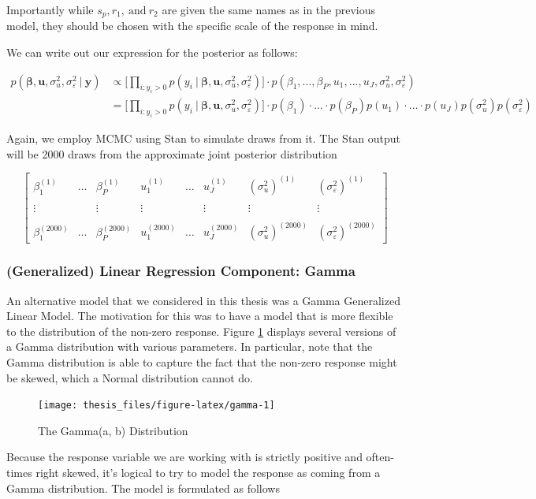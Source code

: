 \documentclass[12pt,twoside]{reedthesis}
\begin{document}
Importantly while \(s_p, r_1, \ \text{and} \ r_2\) are given the same names as in the previous model, they should be chosen with the specific scale of the response in mind.

We can write out our expression for the posterior as follows:

\[
\begin{aligned}
p(\boldsymbol{\beta}, \boldsymbol{u}, \sigma_{u}^2, \sigma_{\varepsilon}^2 \ | \ \mathbf{y}) &\propto \bigg[\prod_{i:y_{i} > 0}p(y_{i} \ | \ \boldsymbol{\beta}, \mathbf{u}, \sigma_{u}^2, \sigma_{\varepsilon}^2)\bigg]\cdot p(\beta_1, ..., \beta_P, u_1, ..., u_J, \sigma_{u}^2, \sigma_{\varepsilon}^2) \\
 &=\bigg[\prod_{i:y_{i} > 0}p(y_{i} \ | \ \boldsymbol{\beta}, \mathbf{u},\sigma_{u}^2, \sigma_{\varepsilon}^2)\bigg]\cdot p(\beta_1)\cdot...\cdot p(\beta_P)p(u_1)\cdot ... \cdot p(u_J)p(\sigma_{u}^2)p( \sigma_{\varepsilon}^2) 
\end{aligned}
\]

Again, we employ MCMC using Stan to simulate draws from it. The Stan output will be 2000 draws from the approximate joint posterior distribution

\[
\begin{bmatrix}
  \beta_1^{(1)} & \dots & \beta_P^{(1)} & u_1^{(1)} & \dots & u_J^{(1)} & (\sigma_{u}^2)^{(1)} & (\sigma_{\varepsilon}^2)^{(1)} \\
  \\ \vdots &  & \vdots & \vdots & & \vdots & \vdots & \vdots \\ \\
  \beta_1^{(2000)} & \dots & \beta_P^{(2000)} & u_1^{(2000)} & \dots & u_J^{(2000)} & (\sigma_{u}^2)^{(2000)} & (\sigma_{\varepsilon}^2)^{(2000)}
\end{bmatrix}
\]

\hypertarget{generalized-linear-regression-component-gamma}{%
\subsubsection{(Generalized) Linear Regression Component: Gamma}\label{generalized-linear-regression-component-gamma}}

An alternative model that we considered in this thesis was a Gamma Generalized Linear Model. The motivation for this was to have a model that is more flexible to the distribution of the non-zero response. Figure \ref{fig:gamma} displays several versions of a Gamma distribution with various parameters. In particular, note that the Gamma distribution is able to capture the fact that the non-zero response might be skewed, which a Normal distribution cannot do.
\begin{figure}

{\centering \texttt{[image: thesis\_files/figure-latex/gamma-1]} 

}

\caption{The Gamma(a, b) Distribution}\label{fig:gamma}
\end{figure}
Because the response variable we are working with is strictly positive and often-times right skewed, it's logical to try to model the response as coming from a Gamma distribution. The model is formulated as follows
\end{document}
